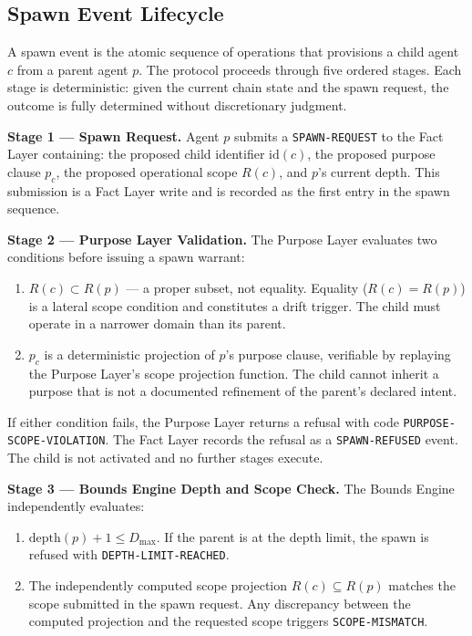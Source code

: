 \documentclass[12pt]{article}
\begin{document}
\subsection{Spawn Event Lifecycle}

A spawn event is the atomic sequence of operations that provisions a child agent $c$ from a parent agent $p$. The protocol proceeds through five ordered stages. Each stage is deterministic: given the current chain state and the spawn request, the outcome is fully determined without discretionary judgment.

\bigskip
\noindent\textbf{Stage 1 — Spawn Request.} Agent $p$ submits a \texttt{SPAWN-REQUEST} to the Fact Layer containing: the proposed child identifier $\mathrm{id}(c)$, the proposed purpose clause $p_c$, the proposed operational scope $R(c)$, and $p$'s current depth. This submission is a Fact Layer write and is recorded as the first entry in the spawn sequence.

\bigskip
\noindent\textbf{Stage 2 — Purpose Layer Validation.} The Purpose Layer evaluates two conditions before issuing a spawn warrant:

\begin{enumerate}
  \item[(PL-V1)] $R(c) \subset R(p)$ — a proper subset, not equality. Equality ($R(c) = R(p)$) is a lateral scope condition and constitutes a drift trigger. The child must operate in a narrower domain than its parent.

  \item[(PL-V2)] $p_c$ is a deterministic projection of $p$'s purpose clause, verifiable by replaying the Purpose Layer's scope projection function. The child cannot inherit a purpose that is not a documented refinement of the parent's declared intent.
\end{enumerate}

If either condition fails, the Purpose Layer returns a refusal with code \texttt{PURPOSE-SCOPE-VIOLATION}. The Fact Layer records the refusal as a \texttt{SPAWN-REFUSED} event. The child is not activated and no further stages execute.

\bigskip
\noindent\textbf{Stage 3 — Bounds Engine Depth and Scope Check.} The Bounds Engine independently evaluates:

\begin{enumerate}
  \item[(BE-V1)] $\mathrm{depth}(p) + 1 \leq D_{\max}$. If the parent is at the depth limit, the spawn is refused with \texttt{DEPTH-LIMIT-REACHED}.

  \item[(BE-V2)] The independently computed scope projection $R(c) \subseteq R(p)$ matches the scope submitted in the spawn request. Any discrepancy between the computed projection and the requested scope triggers \texttt{SCOPE-MISMATCH}.
\end{enumerate}
\end{document}
